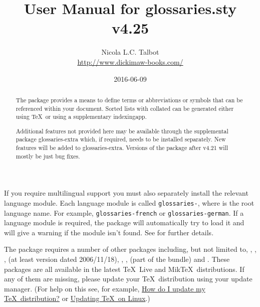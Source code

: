 \documentclass[report,inlinetitle,widecs]{nlctdoc}
\begin{document}
\DeleteShortVerb{\|}

 \title{User Manual for glossaries.sty v4.25}
 \author{Nicola L.C. Talbot\\%
  \url{http://www.dickimaw-books.com/}}

 \date{2016-06-09}
 \maketitle

\begin{abstract}
The  package provides a means to define terms or
abbreviations or symbols that can be referenced within your document.
Sorted lists with collated  can be 
generated either using \TeX\ or using a supplementary \gls{indexingapp}.

Additional features not provided here may be available through
the supplemental package \gls{glossaries-extra} which, if required,
needs to be installed separately. New features will be added to
\gls*{glossaries-extra}. Versions of the 
package after v4.21 will mostly be just bug fixes.
\end{abstract}

If you require multilingual support you must also separately install 
the relevant language module. Each language module is called
\texttt{glossaries-}, where  is the
root language name. For example, \texttt{glossaries-french}
or \texttt{glossaries-german}. If a language module is required,
the  package will automatically try to load it and
will give a warning if the module isn't found. See
 for further details.

The  package requires a number of other packages
including, but not limited to, , ,
,
 (at least version dated 2006/11/18), ,
,  (part of the  bundle) and . These
packages are all available in the latest \TeX\ Live and Mik\TeX\
distributions. If any of them are missing, please update your
\TeX\ distribution using your update manager.
(For help on this see, for example,
\href{http://tex.stackexchange.com/questions/55437/how-do-i-update-my-tex-distribution}{How
do I update my \TeX\ distribution?}
or
\href{http://tex.stackexchange.com/questions/14925/updating-tex-on-linux}{Updating
\TeX\ on Linux}.)
\end{document}
